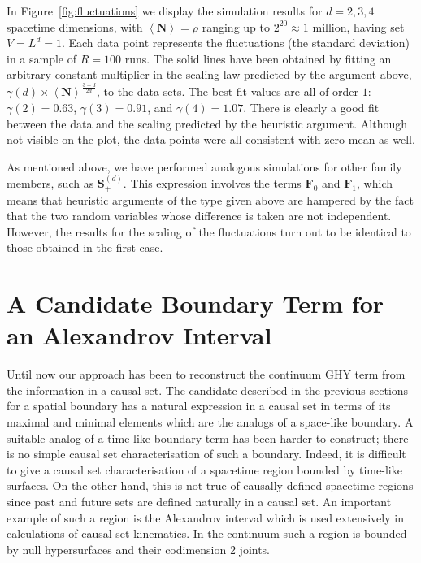 \documentclass[12pt]{article}
\newcommand{\BF}[1]{\mathbf{F}_{#1}}
\begin{document}
In Figure~\ref{fig:fluctuations} we display the simulation results for $d=2,3,4$ spacetime dimensions, with $\left\langle\textbf{N}\right\rangle=\rho$ ranging up to $2^{20}\approx 1$ million, having set $V=L^d=1$. Each data point represents the fluctuations (the standard deviation) in a sample of $R=100$ runs. The solid lines have been obtained by fitting an arbitrary constant multiplier in the scaling law predicted by the argument above, $\gamma (d)\times \left\langle\textbf{N}\right\rangle^\frac{3-d}{2d}$, to the data sets. The best fit values are all of order $1$: $\gamma (2)=0.63$, $\gamma (3)=0.91$, and $\gamma (4)=1.07$.
There is clearly a good fit between the data and the scaling predicted by the heuristic argument. Although not visible on the plot, the data points were all consistent with zero mean as well.

As mentioned above, we have performed analogous simulations for other family members, such as $\mathbf S^{ (d)}_+$. This expression involves the terms $\BF{0}$ and $\BF{1}$, which means that heuristic arguments of the type given above are hampered by the fact that the two random variables whose difference is taken are not independent. However, the results for the scaling of the fluctuations turn out to be identical to those obtained in the first case.

\section{A Candidate Boundary Term for an Alexandrov Interval}
\newcommand{\vol}{\mathrm{vol}}

Until now our approach has been to reconstruct the  continuum GHY term  from the information in a causal set. 
The candidate described in the previous sections for a spatial boundary has a natural expression in a causal set  in  terms of its maximal and minimal elements which are the  analogs of a  space-like boundary.  A suitable analog  of  a time-like boundary  term has been harder to  construct; there is no simple causal set  characterisation of such  a boundary. Indeed, it is difficult to give a causal set  characterisation of a  spacetime region bounded by time-like surfaces. On the other hand, this is not true of causally defined spacetime regions since  past and future sets are defined naturally in  a causal set. An important example of such a region is the  Alexandrov interval which is used extensively  in calculations of causal set kinematics.  In the continuum such a region  is bounded by null hypersurfaces and their codimension 2 joints.  
\end{document}
